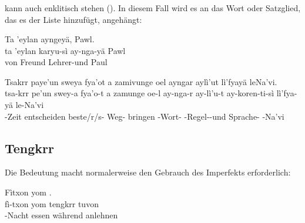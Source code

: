 \subsubsection{}  kann auch enklitisch stehen (). In diesem Fall wird es an das Wort oder Satzglied, das es der Liste hinzufügt, angehängt:

\begin{interlin}
	\glll \Npawl{}Ta 'eylan  ayngeyä, Pawl. \\
	ta 'eylan karyu-sì ay-nga-yä Pawl \\
	von Freund Lehrer-und  Paul \\
\end{interlin}

\begin{interlin}
	\glll \Npawl{}Tsakrr paye'un sweya fya'ot a zamivunge oel ayngar aylì'ut  lì'fyayä leNa'vi. \\
	tsa-krr pe'un swey-a fya'o-t a zamunge oe-l ay-nga-r ay-lì'u-t ay-koren-ti-sì lì'fya-yä le-Na'vi \\
	-Zeit entscheiden beste/r/s- Weg-  bringen   -Wort- -Regel--und Sprache- -Na'vi \\
\end{interlin}


\subsection{Tengkrr} Die Bedeutung   macht normalerweise den Gebrauch des Imperfekts erforderlich:

\begin{interlin}
	\glll \Npawl{}Fìtxon yom  . \\
	fì-txon yom tengkrr tuvon \\
	-Nacht essen während anlehnen \\
\end{interlin}

